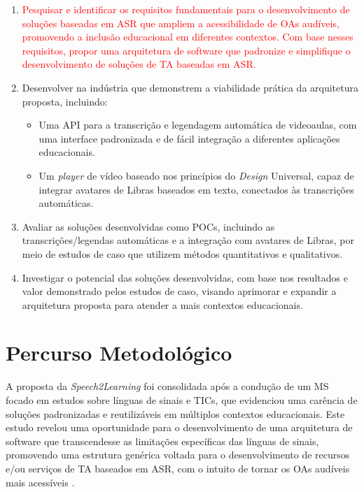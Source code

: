 \begin{enumerate}
\item \textcolor{red}{Pesquisar e identificar os requisitos fundamentais para o desenvolvimento de soluções baseadas em ASR que ampliem a acessibilidade de OAs audíveis, promovendo a inclusão educacional em diferentes contextos. Com base nesses requisitos, propor uma arquitetura de software que padronize e simplifique o desenvolvimento de soluções de TA baseadas em ASR.}
\item Desenvolver  na indústria que demonstrem a viabilidade prática da arquitetura proposta, incluindo:
\begin{itemize}
\item Uma API para a transcrição e legendagem automática de videoaulas, com uma interface padronizada e de fácil integração a diferentes aplicações educacionais.
\item Um \textit{player} de vídeo baseado nos princípios do \textit{Design} Universal, capaz de integrar avatares de Libras baseados em texto, conectados às transcrições automáticas.
\end{itemize}
\item Avaliar as soluções desenvolvidas como POCs, incluindo as transcrições/legendas automáticas e a integração com avatares de Libras, por meio de estudos de caso que utilizem métodos quantitativos e qualitativos.
\item Investigar o potencial das soluções desenvolvidas, com base nos resultados e valor demonstrado pelos estudos de caso, visando aprimorar e expandir a arquitetura proposta para atender a mais contextos educacionais.
\end{enumerate}

\section{Percurso Metodológico}
\label{chapter1:methodological-path}

A proposta da \textit{Speech2Learning} foi consolidada após a condução de um MS focado em estudos sobre línguas de sinais e TICs, que evidenciou uma carência de soluções padronizadas e reutilizáveis em múltiplos contextos educacionais. Este estudo revelou uma oportunidade para o desenvolvimento de uma arquitetura de software que transcendesse as limitações específicas das línguas de sinais, promovendo uma estrutura genérica voltada para o desenvolvimento de recursos e/ou serviços de TA baseados em ASR, com o intuito de tornar os OAs audíveis mais acessíveis \cite{FalvoJr2020_FIE, FalvoJr2020_SBIE, FalvoJr2021_RENOTE}.

